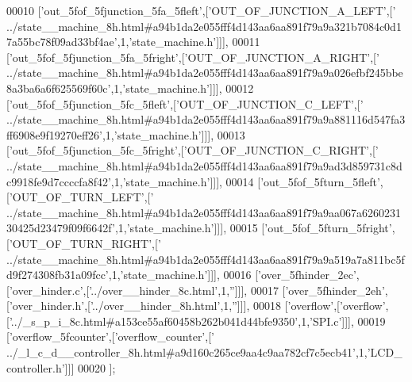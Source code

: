 \begin{DoxyCode}
00010   [\textcolor{stringliteral}{'out\_5fof\_5fjunction\_5fa\_5fleft'},[\textcolor{stringliteral}{'OUT\_OF\_JUNCTION\_A\_LEFT'},[\textcolor{stringliteral}{'
      ../state\_\_machine\_8h.html#a94b1da2e055fff4d143aa6aa891f79a9a321b7084c0d17a55bc78f09ad33bf4ae'},1,\textcolor{stringliteral}{'state\_machine.h'}]]],
00011   [\textcolor{stringliteral}{'out\_5fof\_5fjunction\_5fa\_5fright'},[\textcolor{stringliteral}{'OUT\_OF\_JUNCTION\_A\_RIGHT'},[\textcolor{stringliteral}{'
      ../state\_\_machine\_8h.html#a94b1da2e055fff4d143aa6aa891f79a9a026efbf245bbe8a3ba6a6f625569f60c'},1,\textcolor{stringliteral}{'state\_machine.h'}]]],
00012   [\textcolor{stringliteral}{'out\_5fof\_5fjunction\_5fc\_5fleft'},[\textcolor{stringliteral}{'OUT\_OF\_JUNCTION\_C\_LEFT'},[\textcolor{stringliteral}{'
      ../state\_\_machine\_8h.html#a94b1da2e055fff4d143aa6aa891f79a9a881116d547fa3ff6908e9f19270eff26'},1,\textcolor{stringliteral}{'state\_machine.h'}]]],
00013   [\textcolor{stringliteral}{'out\_5fof\_5fjunction\_5fc\_5fright'},[\textcolor{stringliteral}{'OUT\_OF\_JUNCTION\_C\_RIGHT'},[\textcolor{stringliteral}{'
      ../state\_\_machine\_8h.html#a94b1da2e055fff4d143aa6aa891f79a9ad3d859731c8dc9918fe9d7ccccfa8f42'},1,\textcolor{stringliteral}{'state\_machine.h'}]]],
00014   [\textcolor{stringliteral}{'out\_5fof\_5fturn\_5fleft'},[\textcolor{stringliteral}{'OUT\_OF\_TURN\_LEFT'},[\textcolor{stringliteral}{'
      ../state\_\_machine\_8h.html#a94b1da2e055fff4d143aa6aa891f79a9aa067a626023130425d23479f09f6642f'},1,\textcolor{stringliteral}{'state\_machine.h'}]]],
00015   [\textcolor{stringliteral}{'out\_5fof\_5fturn\_5fright'},[\textcolor{stringliteral}{'OUT\_OF\_TURN\_RIGHT'},[\textcolor{stringliteral}{'
      ../state\_\_machine\_8h.html#a94b1da2e055fff4d143aa6aa891f79a9a519a7a811bc5fd9f274308fb31a09fcc'},1,\textcolor{stringliteral}{'state\_machine.h'}]]],
00016   [\textcolor{stringliteral}{'over\_5fhinder\_2ec'},[\textcolor{stringliteral}{'over\_hinder.c'},[\textcolor{stringliteral}{'../over\_\_hinder\_8c.html'},1,\textcolor{stringliteral}{''}]]],
00017   [\textcolor{stringliteral}{'over\_5fhinder\_2eh'},[\textcolor{stringliteral}{'over\_hinder.h'},[\textcolor{stringliteral}{'../over\_\_hinder\_8h.html'},1,\textcolor{stringliteral}{''}]]],
00018   [\textcolor{stringliteral}{'overflow'},[\textcolor{stringliteral}{'overflow'},[\textcolor{stringliteral}{'../\_s\_p\_i\_8c.html#a153ce55af60458b262b041d44bfe9350'},1,\textcolor{stringliteral}{'SPI.c'}]]],
00019   [\textcolor{stringliteral}{'overflow\_5fcounter'},[\textcolor{stringliteral}{'overflow\_counter'},[\textcolor{stringliteral}{'
      ../\_l\_c\_d\_\_controller\_8h.html#a9d160c265ce9aa4c9aa782cf7c5ecb41'},1,\textcolor{stringliteral}{'LCD\_controller.h'}]]]
00020 ];
\end{DoxyCode}
